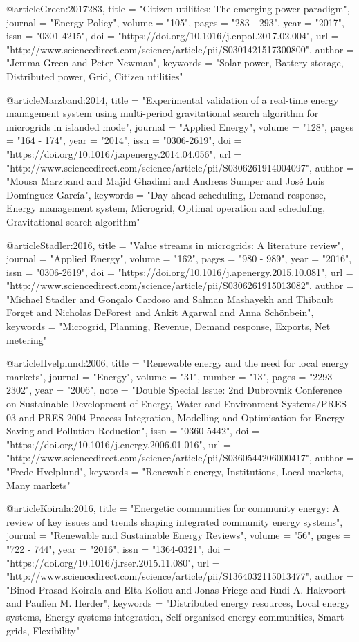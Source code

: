 @article{Green:2017283,
title = "Citizen utilities: The emerging power paradigm",
journal = "Energy Policy",
volume = "105",
pages = "283 - 293",
year = "2017",
issn = "0301-4215",
doi = "https://doi.org/10.1016/j.enpol.2017.02.004",
url = "http://www.sciencedirect.com/science/article/pii/S0301421517300800",
author = "Jemma Green and Peter Newman",
keywords = "Solar power, Battery storage, Distributed power, Grid, Citizen utilities"
}



@article{Marzband:2014,
title = "Experimental validation of a real-time energy management system using multi-period gravitational search algorithm for microgrids in islanded mode",
journal = "Applied Energy",
volume = "128",
pages = "164 - 174",
year = "2014",
issn = "0306-2619",
doi = "https://doi.org/10.1016/j.apenergy.2014.04.056",
url = "http://www.sciencedirect.com/science/article/pii/S0306261914004097",
author = "Mousa Marzband and Majid Ghadimi and Andreas Sumper and José Luis Domínguez-García",
keywords = "Day ahead scheduling, Demand response, Energy management system, Microgrid, Optimal operation and scheduling, Gravitational search algorithm"
}

@article{Stadler:2016,
title = "Value streams in microgrids: A literature review",
journal = "Applied Energy",
volume = "162",
pages = "980 - 989",
year = "2016",
issn = "0306-2619",
doi = "https://doi.org/10.1016/j.apenergy.2015.10.081",
url = "http://www.sciencedirect.com/science/article/pii/S0306261915013082",
author = "Michael Stadler and Gonçalo Cardoso and Salman Mashayekh and Thibault Forget and Nicholas DeForest and Ankit Agarwal and Anna Schönbein",
keywords = "Microgrid, Planning, Revenue, Demand response, Exports, Net metering"
}


@article{Hvelplund:2006,
title = "Renewable energy and the need for local energy markets",
journal = "Energy",
volume = "31",
number = "13",
pages = "2293 - 2302",
year = "2006",
note = "Double Special Issue: 2nd Dubrovnik Conference on Sustainable Development of Energy, Water and Environment Systems/PRES 03 and PRES 2004 Process Integration, Modelling and Optimisation for Energy Saving and Pollution Reduction",
issn = "0360-5442",
doi = "https://doi.org/10.1016/j.energy.2006.01.016",
url = "http://www.sciencedirect.com/science/article/pii/S0360544206000417",
author = "Frede Hvelplund",
keywords = "Renewable energy, Institutions, Local markets, Many markets"
}


@article{Koirala:2016,
title = "Energetic communities for community energy: A review of key issues and trends shaping integrated community energy systems",
journal = "Renewable and Sustainable Energy Reviews",
volume = "56",
pages = "722 - 744",
year = "2016",
issn = "1364-0321",
doi = "https://doi.org/10.1016/j.rser.2015.11.080",
url = "http://www.sciencedirect.com/science/article/pii/S1364032115013477",
author = "Binod Prasad Koirala and Elta Koliou and Jonas Friege and Rudi A. Hakvoort and Paulien M. Herder",
keywords = "Distributed energy resources, Local energy systems, Energy systems integration, Self-organized energy communities, Smart grids, Flexibility"
}

